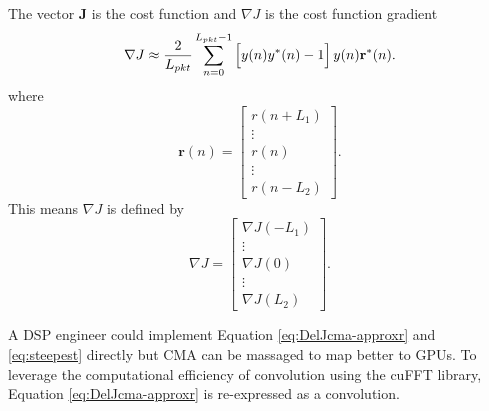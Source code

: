The vector $\mathbf{J}$ is the cost function and $\nabla J$ is the cost function gradient \cite[eq. (352)]{PAQ-phase1}
\begin{equation}
	\nabla J \approx \frac{2}{L_{pkt}} \sum_{n=0}^{L_{pkt}-1}
	\left[ \vphantom{\displaystyle\sum}  y(n) y^\ast(n) - 1 \right]
	y(n)  \mathbf{r}^\ast(n).
\label{eq:DelJcma-approxr}
\end{equation}
where
\begin{equation}
\mathbf{r}(n) = \begin{bmatrix} r(n+L_1) \\ \vdots \\ r(n) \\ \vdots \\ r(n-L_2) \end{bmatrix}.
\end{equation}
This means $\nabla J$ is defined by
\begin{equation}
\nabla J = \begin{bmatrix} \nabla J(-L_1) \\ \vdots \\ \nabla J(0) \\ \vdots \\ \nabla J(L_2) \end{bmatrix}.
\end{equation}

A DSP engineer could implement Equation \eqref{eq:DelJcma-approxr} and \eqref{eq:steepest} directly but CMA can be massaged to map better to GPUs.
To leverage the computational efficiency of convolution using the cuFFT library, Equation \eqref{eq:DelJcma-approxr} is re-expressed as a convolution.


